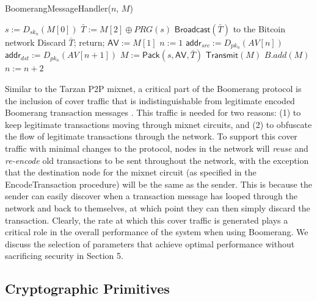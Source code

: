\begin{algorithm*}[t!]
\caption{{\sf BoomerangMessageHandler}($n$, $M$)}
\label{alg:handler}
\begin{algorithmic}[1]

\State $s := D_{sk_{n}}(M[0])$
\State $\bar{T} := M[2] \oplus PRG(s)$
	\State $\mathsf{Broadcast}(\bar{T})$ to the Bitcoin network
	\State Discard $\bar{T}$; return;
\Else
	\State $\mathsf{AV} := M[1]$
	\State $n := 1$
		\State $\mathsf{addr}_{src} := D_{pk_n}(AV[n])$
			\State $\mathsf{addr}_{dst} := D_{pk_n}(AV[n + 1])$
			\State $M := \mathsf{Pack}(s, \mathsf{AV}, \bar{T})$
				\State $\mathsf{Transmit}(M)$
			\Else
				\State $B.add(M)$
			\EndIf
		\Else
			\State $n := n + 2$
		\EndIf
	\EndWhile
\EndIf

\end{algorithmic}
\end{algorithm*}


Similar to the Tarzan P2P mixnet, a critical part of the Boomerang protocol is the inclusion of cover traffic that is indistinguishable from legitimate encoded Boomerang transaction messages \cite{tarzan}. This traffic is needed for two reasons: (1) to keep legitimate transactions moving through mixnet circuits, and (2) to obfuscate the flow of legitimate transactions through the network. To support this cover traffic with minimal changes to the protocol, nodes in the network will \emph{reuse} and \emph{re-encode} old transactions to be sent throughout the network, with the exception that the destination node for the mixnet circuit (as specified in the {\sf EncodeTransaction} procedure) will be the same as the sender. This is because the sender can easily discover when a transaction message has looped through the network and back to themselves, at which point they can then simply discard the transaction. Clearly, the rate at which this cover traffic is generated plays a critical role in the overall performance of the system when using Boomerang. We discuss the selection of parameters that achieve optimal performance without sacrificing security in Section 5. 

\subsection{Cryptographic Primitives}

